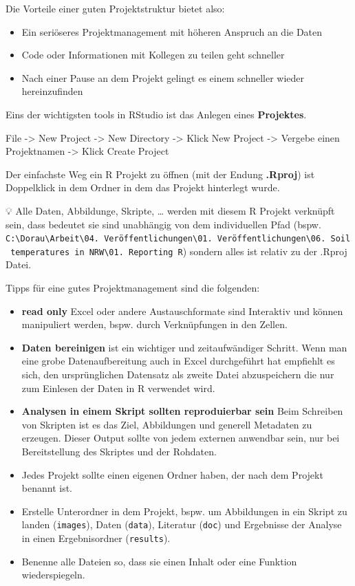 \documentclass[
]{article}
\providecommand{\tightlist}{%
  \setlength{\itemsep}{0pt}\setlength{\parskip}{0pt}}
\begin{document}
Die Vorteile einer guten Projektstruktur bietet also:

\begin{itemize}
\tightlist
\item
  Ein seriöseres Projektmanagement mit höheren Anspruch an die Daten
\item
  Code oder Informationen mit Kollegen zu teilen geht schneller
\item
  Nach einer Pause an dem Projekt gelingt es einem schneller wieder hereinzufinden
\end{itemize}

Eins der wichtigsten tools in RStudio ist das Anlegen eines \textbf{Projektes}.

File -\textgreater{} New Project -\textgreater{} New Directory -\textgreater{} Klick New Project -\textgreater{} Vergebe einen Projektnamen -\textgreater{} Klick Create Project

Der einfachste Weg ein R Projekt zu öffnen (mit der Endung \textbf{.Rproj}) ist Doppelklick in dem Ordner in dem das Projekt hinterlegt wurde.

💡 Alle Daten, Abbildunge, Skripte, \ldots{} werden mit diesem R Projekt verknüpft sein, dass bedeutet sie sind unabhängig von dem individuellen Pfad (bspw. \texttt{C:\textbackslash{}Dorau\textbackslash{}Arbeit\textbackslash{}04.\ Veröffentlichungen\textbackslash{}01.\ Veröffentlichungen\textbackslash{}06.\ Soil\ temperatures\ in\ NRW\textbackslash{}01.\ Reporting\ R}) sondern alles ist relativ zu der .Rproj Datei.

Tipps für eine gutes Projektmanagement sind die folgenden:

\begin{itemize}
\tightlist
\item
  \textbf{read only} Excel oder andere Austauschformate sind Interaktiv und können manipuliert werden, bspw. durch Verknüpfungen in den Zellen.
\item
  \textbf{Daten bereinigen} ist ein wichtiger und zeitaufwändiger Schritt. Wenn man eine grobe Datenaufbereitung auch in Excel durchgeführt hat empfiehlt es sich, den ursprünglichen Datensatz als zweite Datei abzuspeichern die nur zum Einlesen der Daten in R verwendet wird.
\item
  \textbf{Analysen in einem Skript sollten reproduierbar sein} Beim Schreiben von Skripten ist es das Ziel, Abbildungen und generell Metadaten zu erzeugen. Dieser Output sollte von jedem externen anwendbar sein, nur bei Bereitstellung des Skriptes und der Rohdaten.
\item
  Jedes Projekt sollte einen eigenen Ordner haben, der nach dem Projekt benannt ist.
\item
  Erstelle Unterordner in dem Projekt, bspw. um Abbildungen in ein Skript zu landen (\texttt{images}), Daten (\texttt{data}), Literatur (\texttt{doc}) und Ergebnisse der Analyse in einen Ergebnisordner (\texttt{results}).
\item
  Benenne alle Dateien so, dass sie einen Inhalt oder eine Funktion wiederspiegeln.
\end{itemize}
\end{document}
